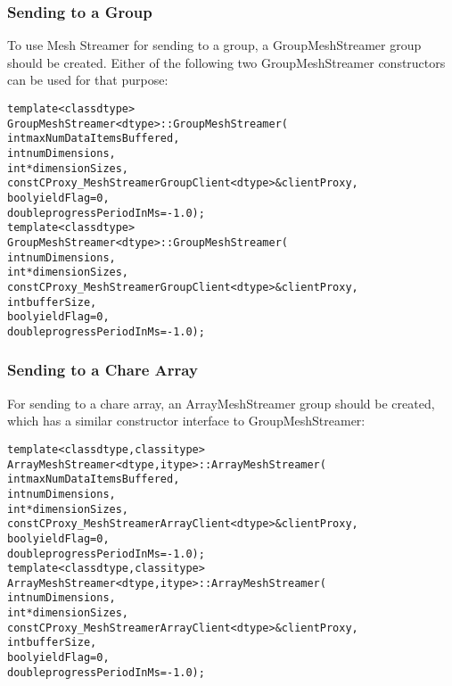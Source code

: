 \subsubsection{Sending to a Group}
To use Mesh Streamer for sending to a group, a GroupMeshStreamer group
should be created. Either of the following two GroupMeshStreamer
constructors can be used for that purpose:

\begin{alltt}
template <class dtype>
GroupMeshStreamer<dtype>::GroupMeshStreamer(
                  int maxNumDataItemsBuffered, 
                  int numDimensions, 
                  int *dimensionSizes, 
                  const CProxy_MeshStreamerGroupClient<dtype>& clientProxy, 
                  bool yieldFlag = 0, 
                  double progressPeriodInMs = -1.0); \\
template <class dtype>
GroupMeshStreamer<dtype>::GroupMeshStreamer(
                  int numDimensions, 
                  int *dimensionSizes, 
                  const CProxy_MeshStreamerGroupClient<dtype>& clientProxy, 
                  int bufferSize, 
                  bool yieldFlag = 0, 
                  double progressPeriodInMs = -1.0);

\end{alltt}

\subsubsection{Sending to a Chare Array}
For sending to a chare array, an ArrayMeshStreamer group should be
created, which has a similar constructor interface to GroupMeshStreamer:

\begin{alltt}
template <class dtype, class itype>
ArrayMeshStreamer<dtype, itype>::ArrayMeshStreamer(
                  int maxNumDataItemsBuffered, 
                  int numDimensions,
                  int *dimensionSizes, 
                  const CProxy_MeshStreamerArrayClient<dtype>& clientProxy,
                  bool yieldFlag = 0, 
                  double progressPeriodInMs = -1.0); \\
template <class dtype, class itype>
ArrayMeshStreamer<dtype, itype>::ArrayMeshStreamer(
                  int numDimensions, 
                  int *dimensionSizes, 
                  const CProxy_MeshStreamerArrayClient<dtype>& clientProxy,
                  int bufferSize, 
                  bool yieldFlag = 0, 
                  double progressPeriodInMs = -1.0);

\end{alltt}

